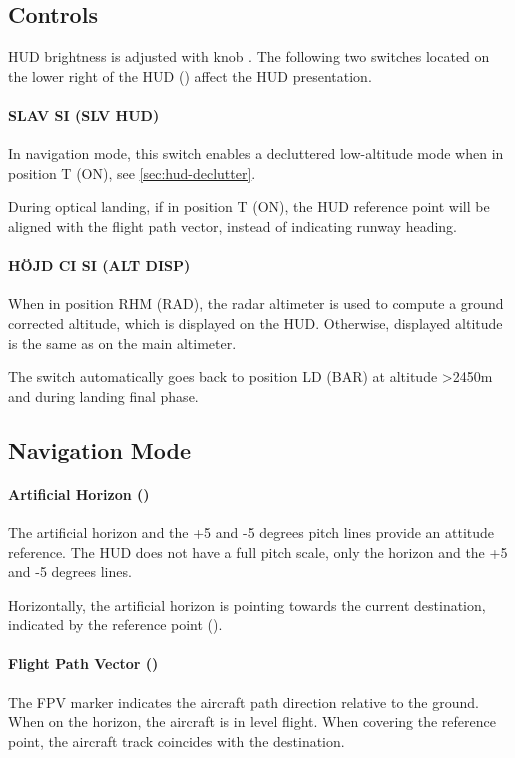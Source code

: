 \subsection{Controls}
HUD brightness is adjusted with knob .
The following two switches located on the lower right of the HUD
() affect the HUD presentation.

\paragraph{SLAV SI (SLV HUD)}
In navigation mode, this switch enables a decluttered low-altitude mode when
in position T (ON), see \cref{sec:hud-declutter}.

During optical landing, if in position T (ON), the HUD reference point will
be aligned with the flight path vector, instead of indicating runway heading.

\paragraph{HÖJD CI SI (ALT DISP)}
When in position RHM (RAD), the radar altimeter is used to compute a ground
corrected altitude, which is displayed on the HUD.
Otherwise, displayed altitude is the same as on the main altimeter.

The switch automatically goes back to position LD (BAR) at altitude >2450m
and during landing final phase.

\subsection{Navigation Mode}
\paragraph{Artificial Horizon ()}
The artificial horizon and the +5 and -5 degrees pitch lines provide an attitude reference.
The HUD does not have a full pitch scale, only the horizon and the +5 and -5 degrees lines.

Horizontally, the artificial horizon is pointing towards the current destination,
indicated by the reference point ().

\paragraph{Flight Path Vector ()}
The FPV marker indicates the aircraft path direction relative to the ground.
When on the horizon, the aircraft is in level flight.
When covering the reference point, the aircraft track coincides with the destination.

